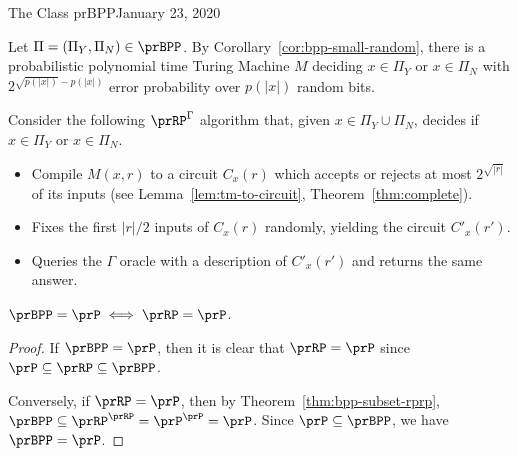 \begin{lecture}{1}{The Class prBPP}{January 23, 2020}
\begin{proofsk}
    Let $\Pi = (\Pi_Y, \Pi_N) \in \prBPP$.
    By Corollary~\ref{cor:bpp-small-random}, there is a probabilistic polynomial time 
    Turing Machine $M$ deciding $x \in \Pi_Y$ or $x \in \Pi_N$ with $2^{\sqrt{p(|x|)} 
    - p(|x|)}$ error probability over $p(|x|)$ random bits.
    
    Consider the following $\prRP^\Gamma$ algorithm that, given $x \in \Pi_Y \cup \Pi_N$, 
    decides if $x \in \Pi_Y$ or $x \in \Pi_N$.
    \begin{itemize}
        \item Compile $M(x,r)$ to a circuit $C_x(r)$ which accepts or rejects at most 
            $2^{\sqrt{|r|}}$ of its inputs (see Lemma~\ref{lem:tm-to-circuit}, 
            Theorem~\ref{thm:complete}).
        \item Fixes the first $|r|/2$ inputs of $C_x(r)$ randomly, yielding the circuit 
            $C'_x(r')$.
        \item Queries the $\Gamma$ oracle with a description of $C'_x(r')$ and returns 
            the same answer.
    \end{itemize}

\end{proofsk}

\begin{corollary}
    $\prBPP = \prP \iff \prRP = \prP$.
\end{corollary}

\begin{proof}
    If $\prBPP = \prP$, then it is clear that $\prRP = \prP$ since $\prP \subseteq
    \prRP \subseteq \prBPP$.

    Conversely, if $\prRP = \prP$, then by Theorem~\ref{thm:bpp-subset-rprp},
    $\prBPP \subseteq \prRP^\prRP = \prP^\prP = \prP$.
    Since $\prP \subseteq \prBPP$, we have $\prBPP = \prP$.
\end{proof}

\end{lecture}
